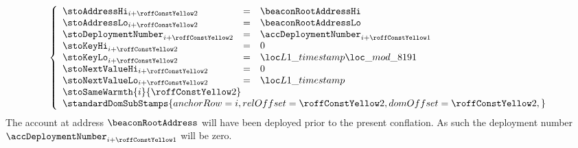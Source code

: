 \item[\underline{\underline{Storing the \inst{TIMESTAMP} in the state:}}]
	\[
		\left\{ \begin{array}{lclr}
			\stoAddressHi        _{i + \roffTxSkipSysiBeaconRootSystemContractStorageSetTimestamp} & = & \beaconRootAddressHi             \\
			\stoAddressLo        _{i + \roffTxSkipSysiBeaconRootSystemContractStorageSetTimestamp} & = & \beaconRootAddressLo             \\
			\stoDeploymentNumber _{i + \roffTxSkipSysiBeaconRootSystemContractStorageSetTimestamp} & = & \accDeploymentNumber             _{i + \roffTxSkipSysiBeaconRootSystemContractAccount} \\
			\stoKeyHi            _{i + \roffTxSkipSysiBeaconRootSystemContractStorageSetTimestamp} & = & 0                                \\
			\stoKeyLo            _{i + \roffTxSkipSysiBeaconRootSystemContractStorageSetTimestamp} & = & \locLayerOneTimeStampModuloPrime \\
			\stoNextValueHi      _{i + \roffTxSkipSysiBeaconRootSystemContractStorageSetTimestamp} & = & 0                                \\
			\stoNextValueLo      _{i + \roffTxSkipSysiBeaconRootSystemContractStorageSetTimestamp} & = & \locLayerOneTimeStamp            \\
			\multicolumn{3}{l}{\stoSameWarmth  {i}{\roffTxSkipSysiBeaconRootSystemContractStorageSetTimestamp} } \\
			\multicolumn{3}{l}{
				\standardDomSubStamps {
					anchorRow = i                                                          ,
					relOffset = \roffTxSkipSysiBeaconRootSystemContractStorageSetTimestamp ,
					domOffset = \roffTxSkipSysiBeaconRootSystemContractStorageSetTimestamp ,
				}} \\
		\end{array} \right.
	\]
	\saNote{} \label{hub: tx skip: sysi: eip 4788: deployment number of system contract}
	The account at address $\beaconRootAddress$ will have been deployed prior to the present conflation.
	As such the deployment number
	$\accDeploymentNumber _{i + \roffTxSkipSysiBeaconRootSystemContractAccount}$
	will be zero.

